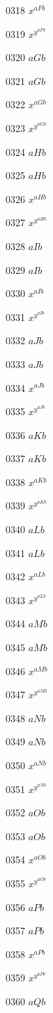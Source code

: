 \documentclass{article}
\begin{document}
0318 $x^{aFb}$\par
0319 $x^{y^{aFb}}$\par
0320 $aGb$\par
0321 $\displaystyle aGb$\par
0322 $x^{aGb}$\par
0323 $x^{y^{aGb}}$\par
0324 $aHb$\par
0325 $\displaystyle aHb$\par
0326 $x^{aHb}$\par
0327 $x^{y^{aHb}}$\par
0328 $aIb$\par
0329 $\displaystyle aIb$\par
0330 $x^{aIb}$\par
0331 $x^{y^{aIb}}$\par
0332 $aJb$\par
0333 $\displaystyle aJb$\par
0334 $x^{aJb}$\par
0335 $x^{y^{aJb}}$\par
0336 $aKb$\par
0337 $\displaystyle aKb$\par
0338 $x^{aKb}$\par
0339 $x^{y^{aKb}}$\par
0340 $aLb$\par
0341 $\displaystyle aLb$\par
0342 $x^{aLb}$\par
0343 $x^{y^{aLb}}$\par
0344 $aMb$\par
0345 $\displaystyle aMb$\par
0346 $x^{aMb}$\par
0347 $x^{y^{aMb}}$\par
0348 $aNb$\par
0349 $\displaystyle aNb$\par
0350 $x^{aNb}$\par
0351 $x^{y^{aNb}}$\par
0352 $aOb$\par
0353 $\displaystyle aOb$\par
0354 $x^{aOb}$\par
0355 $x^{y^{aOb}}$\par
0356 $aPb$\par
0357 $\displaystyle aPb$\par
0358 $x^{aPb}$\par
0359 $x^{y^{aPb}}$\par
0360 $aQb$\par
\end{document}
